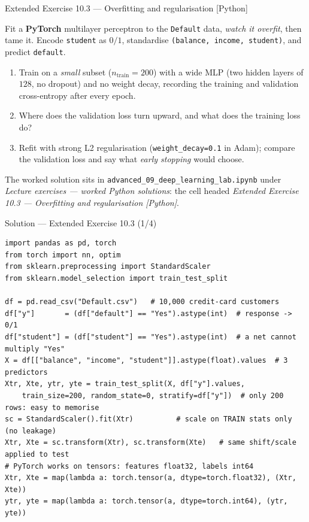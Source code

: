 \documentclass[aspectratio=169,11pt]{beamer}
\begin{document}
\begin{frame}{Extended Exercise 10.3 --- Overfitting and regularisation [Python]}
\begin{longexercise}
  Fit a \textbf{PyTorch} multilayer perceptron to the \texttt{Default} data,
  \emph{watch it overfit}, then tame it. Encode \texttt{student} as $0/1$, standardise
  \texttt{(balance, income, student)}, and predict \texttt{default}.
  \begin{enumerate}
    \item Train on a \emph{small} subset ($n_{\text{train}}=200$) with a wide MLP
          (two hidden layers of $128$, no dropout) and no weight decay, recording the
          training and validation cross-entropy after every epoch.
    \item Where does the validation loss turn upward, and what does the training loss do?
    \item Refit with strong L2 regularisation
          (\texttt{weight\_decay=0.1} in Adam); compare the validation
          loss and say what \emph{early stopping} would choose.
  \end{enumerate}
\end{longexercise}
\begin{labnote}
  The worked solution sits in \texttt{advanced\_09\_deep\_learning\_lab.ipynb} under
  \emph{Lecture exercises --- worked Python solutions}: the cell headed
  \emph{Extended Exercise 10.3 --- Overfitting and regularisation [Python]}.
\end{labnote}
\end{frame}

\begin{frame}[fragile]{Solution --- Extended Exercise 10.3 (1/4)}
\begin{solutionbox}
\begin{lstlisting}[basicstyle=\ttfamily\scriptsize]
import pandas as pd, torch
from torch import nn, optim
from sklearn.preprocessing import StandardScaler
from sklearn.model_selection import train_test_split

df = pd.read_csv("Default.csv")   # 10,000 credit-card customers
df["y"]       = (df["default"] == "Yes").astype(int)  # response -> 0/1
df["student"] = (df["student"] == "Yes").astype(int)  # a net cannot multiply "Yes"
X = df[["balance", "income", "student"]].astype(float).values  # 3 predictors
Xtr, Xte, ytr, yte = train_test_split(X, df["y"].values,
    train_size=200, random_state=0, stratify=df["y"])  # only 200 rows: easy to memorise
sc = StandardScaler().fit(Xtr)          # scale on TRAIN stats only (no leakage)
Xtr, Xte = sc.transform(Xtr), sc.transform(Xte)   # same shift/scale applied to test
# PyTorch works on tensors: features float32, labels int64
Xtr, Xte = map(lambda a: torch.tensor(a, dtype=torch.float32), (Xtr, Xte))
ytr, yte = map(lambda a: torch.tensor(a, dtype=torch.int64), (ytr, yte))
\end{lstlisting}
\end{solutionbox}
\end{frame}
\end{document}
